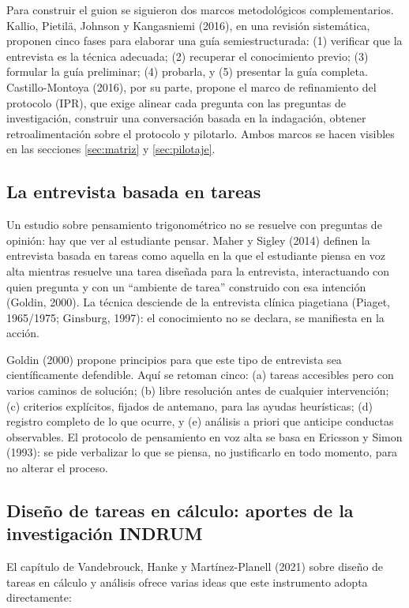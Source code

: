 \documentclass[11pt,letterpaper]{article}
\newcounter{preg}
\begin{document}
Para construir el guion se siguieron dos marcos metodológicos complementarios. Kallio, Pietilä, Johnson y Kangasniemi (2016), en una revisión sistemática, proponen cinco fases para elaborar una guía semiestructurada: (1) verificar que la entrevista es la técnica adecuada; (2) recuperar el conocimiento previo; (3) formular la guía preliminar; (4) probarla, y (5) presentar la guía completa. Castillo-Montoya (2016), por su parte, propone el marco de refinamiento del protocolo (IPR), que exige alinear cada pregunta con las preguntas de investigación, construir una conversación basada en la indagación, obtener retroalimentación sobre el protocolo y pilotarlo. Ambos marcos se hacen visibles en las secciones \ref{sec:matriz} y \ref{sec:pilotaje}.

\subsection{La entrevista basada en tareas}
Un estudio sobre pensamiento trigonométrico no se resuelve con preguntas de opinión: hay que ver al estudiante pensar. Maher y Sigley (2014) definen la entrevista basada en tareas como aquella en la que el estudiante piensa en voz alta mientras resuelve una tarea diseñada para la entrevista, interactuando con quien pregunta y con un ``ambiente de tarea'' construido con esa intención (Goldin, 2000). La técnica desciende de la entrevista clínica piagetiana (Piaget, 1965/1975; Ginsburg, 1997): el conocimiento no se declara, se manifiesta en la acción.

Goldin (2000) propone principios para que este tipo de entrevista sea científicamente defendible. Aquí se retoman cinco: (a) tareas accesibles pero con varios caminos de solución; (b) libre resolución antes de cualquier intervención; (c) criterios explícitos, fijados de antemano, para las ayudas heurísticas; (d) registro completo de lo que ocurre, y (e) análisis a priori que anticipe conductas observables. El protocolo de pensamiento en voz alta se basa en Ericsson y Simon (1993): se pide verbalizar lo que se piensa, no justificarlo en todo momento, para no alterar el proceso.

\subsection{Diseño de tareas en cálculo: aportes de la investigación INDRUM}
El capítulo de Vandebrouck, Hanke y Martínez-Planell (2021) sobre diseño de tareas en cálculo y análisis ofrece varias ideas que este instrumento adopta directamente:
\end{document}
